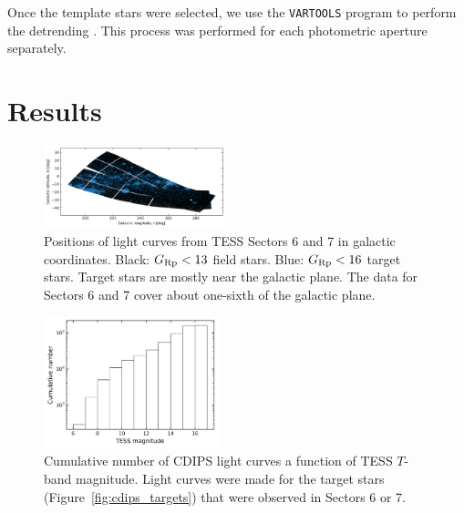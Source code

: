 \documentclass[12pt,twocolumn,tighten]{aastex62}
\begin{document}
Once the template stars were selected, we use the \texttt{VARTOOLS}
program to perform the detrending \citep{Hartman_Bakos_2016}.
This process was performed for each photometric aperture
separately.


\section{Results}
\label{sec:results}

\begin{figure}[!t]
	\begin{center}
		\leavevmode
		\includegraphics[width=0.47\textwidth]{galacticcoords_cluster_field_star_positions.png}
	\end{center}
	\vspace{-0.5cm}
	\caption{
		Positions of light curves from TESS Sectors 6
			and 7 in galactic coordinates.
		Black: $G_{\rm Rp}<13$ field stars.  Blue: $G_{\rm Rp}<16$
		target stars.  Target stars are mostly near the galactic
		plane. The data for Sectors 6 and 7 cover about one-sixth of
		the galactic plane.
		\label{fig:lcgalactic}
	}
\end{figure}



\begin{figure}[!t]
	\begin{center}
		\leavevmode
		\includegraphics[width=0.45\textwidth]{cdf_T_mag.png}
	\end{center}
	\vspace{-0.5cm}
	\caption{
		Cumulative number of CDIPS light curves a function of TESS
			$T$-band magnitude.  Light curves were made for the
		target stars (Figure~\ref{fig:cdips_targets}) that were observed
		in Sectors 6 or 7.
		\label{fig:cdf_T_mag}
	}
\end{figure}
\end{document}
